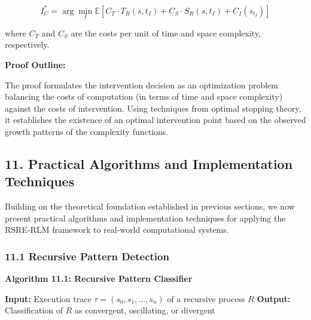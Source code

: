 \documentclass[
]{article}
\begin{document}
\[I^*_C = \arg\min_I \mathbb{E}[C_T \cdot T_R(s, t_I) + C_S \cdot S_R(s, t_I) + C_I(s_{t_I})]\]

where \(C_T\) and \(C_S\) are the costs per unit of time and space
complexity, respectively.

\textbf{Proof Outline:}

The proof formulates the intervention decision as an optimization
problem balancing the costs of computation (in terms of time and space
complexity) against the costs of intervention. Using techniques from
optimal stopping theory, it establishes the existence of an optimal
intervention point based on the observed growth patterns of the
complexity functions.

\subsection{11. Practical Algorithms and Implementation
Techniques}\label{practical-algorithms-and-implementation-techniques}

Building on the theoretical foundation established in previous sections,
we now present practical algorithms and implementation techniques for
applying the RSRE-RLM framework to real-world computational systems.

\subsubsection{11.1 Recursive Pattern
Detection}\label{recursive-pattern-detection}

\textbf{Algorithm 11.1: Recursive Pattern Classifier}

\textbf{Input:} Execution trace \(\tau = (s_0, s_1, ..., s_n)\) of a
recursive process \(R\) \textbf{Output:} Classification of \(R\) as
convergent, oscillating, or divergent
\end{document}
